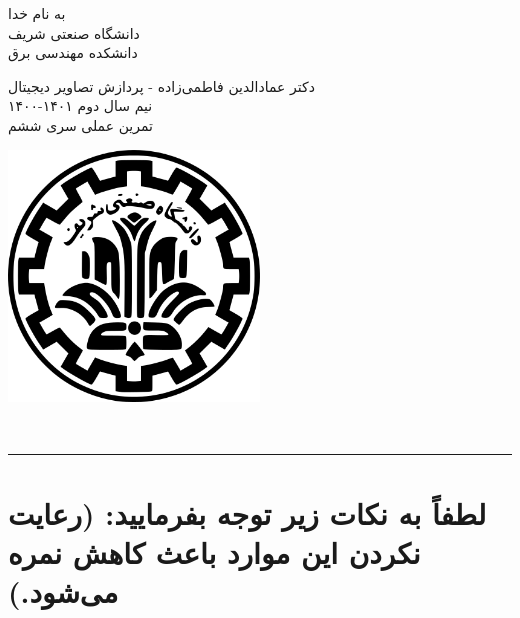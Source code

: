 \documentclass[a4paper]{article}
\begin{document}
\begin{minipage}{0.6\textwidth}
\begin{bf}
	\begin{center}
		به نام خدا\\
		\vspace{0.25cm}
		دانشگاه صنعتی شریف\\
		\vspace{0.25cm}
		دانشکده مهندسی برق\\
		\vspace{0.5cm}
	
	\large
	دکتر عمادالدین فاطمی‌زاده - پردازش تصاویر دیجیتال \\
	نیم سال دوم
	۱۴۰۱-۱۴۰۰\\
	\Large
	\vspace{0.4cm}
	تمرین عملی سری ششم\\
	\end{center}
\end{bf}
\normalsize
\end{minipage} \hfill
\begin{minipage}{0.35\textwidth}
\begin{flushleft}
\includegraphics[width=0.5\textwidth]{Shariflogo.png}\\ \large
\end{flushleft}

 \end{minipage}
\\

\rule[0.1\baselineskip]{\textwidth}{1pt}

\large
\section*{
لطفاً به نکات زیر توجه بفرمایید: (رعایت نکردن این موارد باعث کاهش نمره می‌شود.)
}
\end{document}
